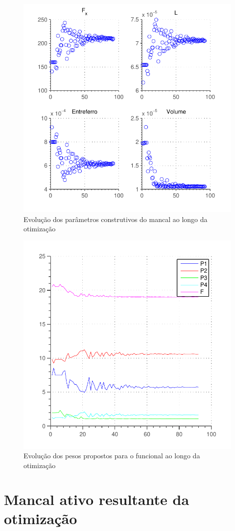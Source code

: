 \begin{figure}[ht!]
	\centering
	\includegraphics[width=0.7\linewidth]{Figs/Simulacoes/Ativo/otimizacao_ativo_parametros}
	\caption{Evolução dos parâmetros construtivos do mancal ao longo da otimização}
	\label{fig:otimizacao_ativo_parametros}
\end{figure}

\begin{figure}[ht!]
\centering
\includegraphics[width=0.7\linewidth]{Figs/Simulacoes/Ativo/otimizacao_ativo_pesos}
\caption{Evolução dos pesos propostos para o funcional ao longo da otimização}
\label{fig:otimizacao_ativo_pesos}
\end{figure}


\section{Mancal ativo resultante da otimização}

